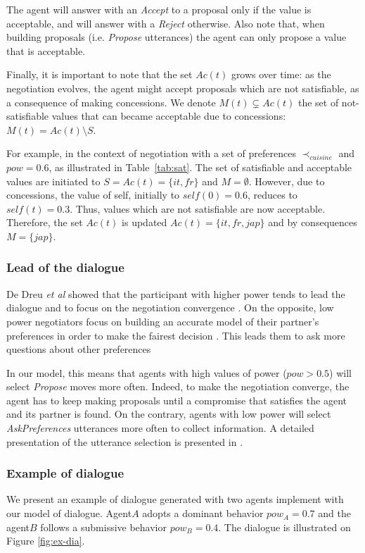 \documentclass[conference, letterpaper]{IEEEtran}
\begin{document}
	The agent will answer with an \emph{Accept} to a proposal only if the value is acceptable, and will answer with a \emph{Reject} otherwise. Also note that, when building proposals (i.e. \emph{Propose} utterances) the agent can only propose a value that is acceptable.
	
	Finally, it is important to note that the set $Ac(t)$ grows over time: as the negotiation evolves, the agent might accept proposals which are not satisfiable, as a consequence of making concessions. We denote $M(t)\subsetneq Ac(t)$ the set of not-satisfiable values that can became acceptable due to concessions: $M(t)=Ac(t)\setminus S$.

	For example, in the context of negotiation with a set of preferences $\prec_{cuisine}$ and $pow= 0.6$, as illustrated in Table~\ref{tab:sat}. The set of satisfiable and acceptable values are initiated to $S=Ac(t)=\{it,fr\}$ and $M= \emptyset$. 
	However, due to concessions, the value of self, initially to $self(0)=0.6$, reduces to $self(t)=0.3$. Thus, values which are not satisfiable are now acceptable. Therefore, the set $Ac(t)$  is updated  $Ac(t)=\{it,fr,jap\}$ and by consequences $M=\{jap\}$. 
	
	\subsubsection{Lead of the dialogue}
	De Dreu \textit{et al} showed that the participant with higher power tends to lead the dialogue and to focus on the negotiation convergence \cite{magee2007power,de2004influence}. On the opposite, low power negotiators focus on building an accurate model of their partner's preferences in order to make the fairest decision \cite{de1995impact}. This leads them to ask more questions about other preferences
	
	In our model, this means that agents with high values of power ($pow>0.5$) will select \emph{Propose} moves more often. Indeed, to make the negotiation converge, the agent has to keep making proposals until a compromise that satisfies the agent and its partner is found.
	On the contrary, agents with low power will select \emph{AskPreferences} utterances more often to collect information. A detailed presentation of the utterance selection is presented in \cite{ouali2017computational}.
		
	
	\subsubsection{Example of dialogue}	
		We present an example of dialogue generated with two agents implement with our model of dialogue. Agent$A$ adopts a dominant behavior $pow_A =0.7$ and the agent$B$ follows a submissive behavior $pow_B =0.4$. The dialogue is illustrated on Figure \ref{fig:ex-dia}.
		
\end{document}
